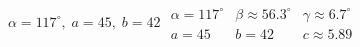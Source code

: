 { $\alpha = 117^{\circ}, \; a = 45, \; b = 42$}
{$\begin{array}{lll}\alpha = 117^{\circ} & \beta \approx 56.3^{\circ} & \gamma \approx 6.7^{\circ} \\a = 45 & b = 42 & c \approx 5.89 \end{array}$}

